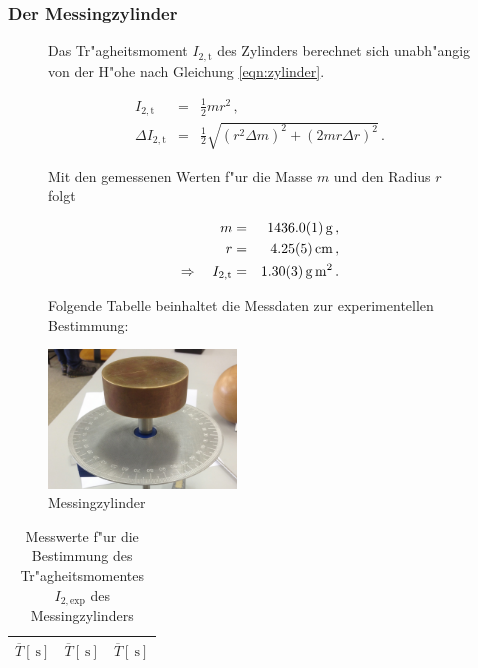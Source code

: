 			\subsubsection{Der Messingzylinder}
			\label{subsubsec:holzkugel}
				\begin{figure}[htbp]
					\begin{minipage}[t]{8cm}
						\vspace{0pt}
						Das Tr"agheitsmoment $I_\mathrm{2, t}$ des Zylinders berechnet sich unabh"angig von der H"ohe nach Gleichung \eqref{eqn:zylinder}.

						\begin{eqnarray}
							I_\mathrm{2, t} & = & \frac{1}{2}mr^2 \,, \label{eqn:zylinder} \\
							\Delta I_\mathrm{2, t} & = & \frac{1}{2} \sqrt{ \left(r^2 \Delta m\right)^2 + \left( 2 mr \Delta r\right)^2} \,. \nonumber
						\end{eqnarray}

						Mit den gemessenen Werten f"ur die Masse $m$ und den Radius $r$ folgt

						\begin{eqnarray*}
							m & = & \SI{1436.0 (1)}{\gram} \,, \\
							r & = & \SI{4.25 (5)}{\centi \meter} \,, \\
							\Rightarrow \quad I_\mathrm{2, t} & = & \SI{1.30 (3)}{\gram \meter \squared} \,.
						\end{eqnarray*}

						Folgende Tabelle beinhaltet die Messdaten zur experimentellen Bestimmung:
					\end{minipage}
					\hfill
					\begin{minipage}[t]{5cm}
						\vspace{0pt}
						\centering
						\includegraphics[width = 5cm]{img/messing.jpg}
						\caption{Messingzylinder}
						\label{fig:zylinder}
					\end{minipage}
				\end{figure}

				\begin{table}[h!]
					\begin{center}
						\caption{Messwerte f"ur die Bestimmung des Tr"agheitsmomentes $I_\mathrm{2, exp}$ des Messingzylinders \label{tabelle:kugel}}
						\begin{tabular}{|c||c||c|}
							\hline
							$\overline{T} [\SI{}{\second}]$ & $\overline{T} [\SI{}{\second}]$ & $\overline{T} [\SI{}{\second}]$ \\
							\hline 
							\hline
							
							\hline 
						\end{tabular}
					\end{center}
				\end{table}

